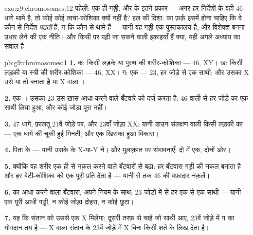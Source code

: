 \begin{solution}{exo:g9:chromosomes:12}
पहेली: एक ही गड्डी, और  के इतने प्रकार --- अगर हर 
निर्देशों के वही 46 धागे थामे है, तो कोई  कोई त्वचा-कोशिका क्यों
नहीं है? हल की दिशा:  का फ़र्क़ इसमें होना चाहिए कि वे कौन-से
निर्देश \emph{पढ़ती} हैं, न कि कौन-से थामे हैं --- यानी वह गड्डी एक
पुस्तकालय है, और विशेषज्ञ बनना उधार लेने की एक नीति। और किसी  पर
पढ़ी जा सकने वाली इकाइयाँ हैं क्या, यही अगले अध्याय का सवाल है।
\end{solution}

\begin{solution}{pb:g9:chromosomes:1}
\textbf{1.} क: किसी लड़के या पुरुष की शरीर-कोशिका --- 46, XY। ख: किसी
लड़की या स्त्री की शरीर-कोशिका --- 46, XX। ग: एक  --- 23, हर जोड़े
से एक साथी; और उसका X उसे या तो  बनाता है या X वाला ।

\textbf{2.} एक । उसका 23 उस ख़ास आधा करने वाले बँटवारे को दर्ज
करता है: 46 वाली  से हर जोड़े का एक साथी लिया हुआ, और कोई जोड़ा
पूरा नहीं।

\textbf{3.} 47 धागे, फ़ालतू 21वें जोड़े पर, और 23वाँ जोड़ा XX: यानी डाउन
संलक्षण वाली किसी लड़की का  --- एक धागे की चूकी हुई गिनती,
और एक खिसका हुआ विकास।

\textbf{4.} पिता के --- यानी उसके  के X-या-Y ने। और मुलाक़ात पर
संभावनाएँ: दो में एक, दोनों ओर।

\textbf{5.} क्योंकि वह शरीर एक ही  से नक़ल करने वाले बँटवारों से
बढ़ा: हर बँटवारा गड्डी की नक़ल बनाता है और हर बेटी-कोशिका को एक पूरी
प्रति देता है --- यानी  से  तक 46 की वफ़ादार नक़लें।

\textbf{6.}  का आधा करने वाला बँटवारा, अपने नियम के साथ: 23
जोड़ों में से हर एक से एक साथी --- यानी एक पूरी आधी गड्डी, न कोई जोड़ा
दोहरा, न कोई छूटा।

\textbf{7.} यह कि संतान को उससे एक X मिलेगा: दूसरी तरफ़ से चाहे जो साथी
आए, 23वें जोड़े में ग का योगदान तय है --- X वाला  संतान के 23वें
जोड़े में X बिना किसी शर्त के लिख देता है।


\end{solution}
